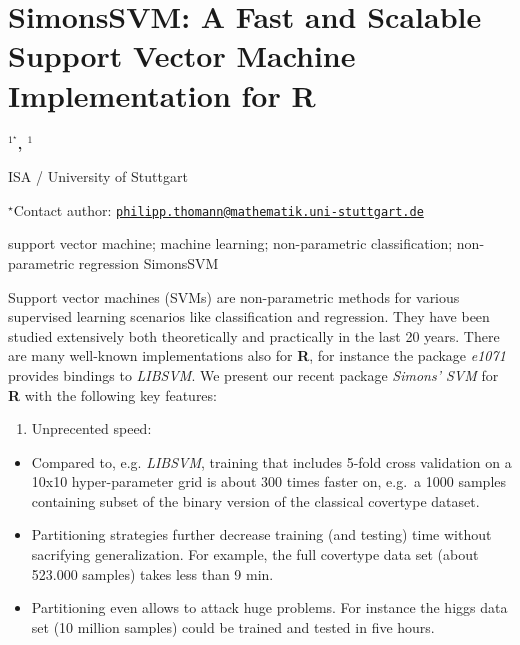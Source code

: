 \documentclass[\main/boa.tex]{subfiles}
\begin{document}
\section{SimonsSVM: A Fast and Scalable Support Vector Machine Implementation for
R}

\begin{center}
  {\bf {}$^{1^\star}$, $^{1}$}
\end{center}

\vskip 0.3cm

\begin{affiliations}
\begin{enumerate}
\begin{minipage}{0.915\textwidth}
\centering
\item ISA / University of Stuttgart \\[-2pt]
\end{minipage}
\end{enumerate}
$^\star$Contact author: \href{mailto:philipp.thomann@mathematik.uni-stuttgart.de}{\nolinkurl{philipp.thomann@mathematik.uni-stuttgart.de}}\\
\end{affiliations}

\vskip 0.5cm

\begin{minipage}{0.915\textwidth}
\keywords support vector machine; machine learning; non-parametric classification;
non-parametric regression
\packages SimonsSVM
\end{minipage}

\vskip 0.8cm

Support vector machines (SVMs) are non-parametric methods for various
supervised learning scenarios like classification and regression. They
have been studied extensively both theoretically and practically in the
last 20 years. There are many well-known implementations also for
\textbf{R}, for instance the package \emph{e1071} provides bindings to
\emph{LIBSVM}. We present our recent package \emph{Simons' SVM} for
\textbf{R} with the following key features:

\begin{enumerate}
\def\labelenumi{\arabic{enumi}.}
\tightlist
\item
  Unprecented speed:
\end{enumerate}

\begin{itemize}
\tightlist
\item
  Compared to, e.g. \emph{LIBSVM}, training that includes 5-fold cross
  validation on a 10x10 hyper-parameter grid is about 300 times faster
  on, e.g.~a 1000 samples containing subset of the binary version of the
  classical covertype dataset.
\item
  Partitioning strategies further decrease training (and testing) time
  without sacrifying generalization. For example, the full covertype
  data set (about 523.000 samples) takes less than 9 min.
\item
  Partitioning even allows to attack huge problems. For instance the
  higgs data set (10 million samples) could be trained and tested in
  five hours.
\end{itemize}
\end{document}

